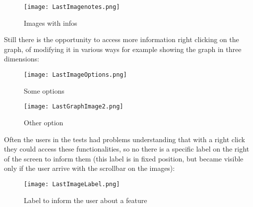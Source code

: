 \begin{figure}[H]
\centering
\texttt{[image: LastImagenotes.png]} 
\caption{Images with infos}
\end{figure}   

Still there is the opportunity to access more information right clicking on the graph, of modifying it in various ways for example showing the graph in three dimensions: 

\begin{figure}[H]
\centering
\texttt{[image: LastImageOptions.png]} 
\caption{Some options}
\end{figure}  

\begin{figure}[H]
\centering
\texttt{[image: LastGraphImage2.png]} 
\caption{Other option}
\end{figure}  

Often the users in the tests had problems understanding that with a right click they could access these functionalities, so no there is a specific label on the right of the screen to inform them (this label is in fixed position, but became visible only if the user arrive with the scrollbar on the images):

\begin{figure}[H]
\centering
\texttt{[image: LastImageLabel.png]} 
\caption{Label to inform the user about a feature}
\end{figure} 

